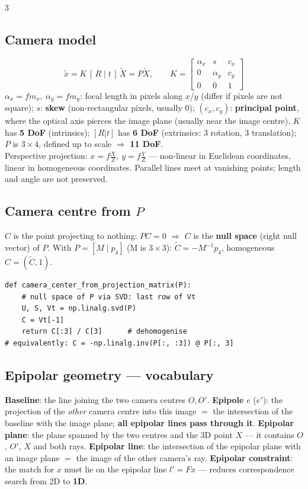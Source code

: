 \documentclass[9pt,a4paper,landscape]{extarticle}
\newcommand{\key}[1]{\textbf{#1}}
\begin{document}
\begin{multicols}{3}
\subsection{Camera model}
$$\tilde x = K\,[\,R\mid t\,]\,\tilde X = P\tilde X,\qquad
K=\begin{bmatrix}\alpha_x & s & c_x\\ 0 & \alpha_y & c_y\\ 0&0&1\end{bmatrix}$$
$\alpha_x=f m_x,\ \alpha_y=f m_y$: focal length in pixels along $x$/$y$ (differ if pixels are not square); $s$: \key{skew} (non-rectangular pixels, usually 0); $(c_x,c_y)$: \key{principal point}, where the optical axis pierces the image plane (usually near the image centre). $K$ has \key{5 DoF} (intrinsics); $[R|t]$ has \key{6 DoF} (extrinsics: 3 rotation, 3 translation); $P$ is $3\times4$, defined up to scale $\Rightarrow$ \key{11 DoF}.\\
Perspective projection: $x=f\frac{X}{Z},\ y=f\frac{Y}{Z}$ --- non-linear in Euclidean coordinates, linear in homogeneous coordinates. Parallel lines meet at vanishing points; length and angle are not preserved.

\subsection{Camera centre from $P$}
$C$ is the point projecting to nothing: $PC=0$ $\Rightarrow$ $C$ is the \key{null space} (right null vector) of $P$. With $P=[M\mid p_4]$ (M is $3\times3$): $\tilde C=-M^{-1}p_4$, homogeneous $C=(\tilde C,1)$.
{\footnotesize\begin{verbatim}
def camera_center_from_projection_matrix(P):
    # null space of P via SVD: last row of Vt
    U, S, Vt = np.linalg.svd(P)
    C = Vt[-1]
    return C[:3] / C[3]      # dehomogenise
# equivalently: C = -np.linalg.inv(P[:, :3]) @ P[:, 3]
\end{verbatim}}

\subsection{Epipolar geometry --- vocabulary}
\key{Baseline}: the line joining the two camera centres $O,O'$. \key{Epipole} $e$ ($e'$): the projection of the \emph{other} camera centre into this image $=$ the intersection of the baseline with the image plane; \key{all epipolar lines pass through it}. \key{Epipolar plane}: the plane spanned by the two centres and the 3D point $X$ --- it contains $O$, $O'$, $X$ and both rays. \key{Epipolar line}: the intersection of the epipolar plane with an image plane $=$ the image of the other camera's ray. \key{Epipolar constraint}: the match for $x$ must lie on the epipolar line $l'=Fx$ --- reduces correspondence search from 2D to \key{1D}.


\end{multicols}
\end{document}
